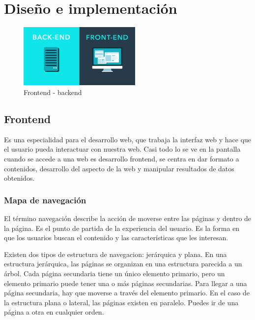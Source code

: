\documentclass[a4paper, 12pt]{book}
\begin{document}

\cleardoublepage
\chapter{Dise\~no e implementaci\'on}

\begin{figure}[H]
  \centering
  \includegraphics[width=6cm]{img/frontend-backend.png}
  \caption{Frontend - backend}
  \label{figura:frontend_backend}
\end{figure}


\section{Frontend}
\label{sec:frontend}

Es una especialidad para el desarrollo web, que trabaja la interfaz web y hace que el usuario pueda interactuar con nuestra web.
Casi todo lo se ve en la pantalla cuando se accede a una web es desarrollo frontend, se centra en dar formato a contenidos, desarrollo del aspecto de la web y manipular resultados de datos obtenidos.

\subsection{Mapa de navegaci\'on}
\label{sec:mapa_navegacion}

El t\'ermino navegaci\'on describe la acci\'on de moverse entre las p\'aginas y dentro de la p\'agina.
Es el punto de partida de la experiencia del usuario. Es la forma en que los usuarios buscan el
contenido y las caracter\'isticas que les interesan.

Existen dos tipos de estructura de navegacion: jer\'arquica y plana. En una estructura jer\'arquica,
las p\'aginas se organizan en una estructura parecida a un \'arbol. Cada p\'agina secundaria tiene un
\'unico elemento primario, pero un elemento primario puede tener una o m\'as p\'aginas secundarias.
Para llegar a una p\'agina secundaria, hay que moverse a trav\'es del elemento primario. En el caso
de la estructura plana o lateral, las p\'aginas existen en paralelo. Puedes ir de una p\'agina a otra
en cualquier orden.
\end{document}
